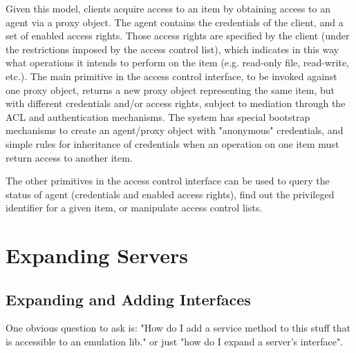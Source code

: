 Given this model, clients acquire access to an item by obtaining
access to an agent via a proxy object. The agent contains the
credentials of the client, and a set of enabled access rights. Those
access rights are specified by the client (under the restrictions
imposed by the access control list), which indicates in this way what
operations it intends to perform on the item (e.g. read-only file,
read-write, etc.). The main primitive in the access control interface,
to be invoked against one proxy object, returns a new proxy object
representing the same item, but with different credentials and/or
access rights, subject to mediation through the ACL and authentication
mechanisms. The system has special bootstrap mechanisms to create an
agent/proxy object with "anonymous" credentials, and simple rules for
inheritance of credentials when an operation on one item must return
access to another item.

The other primitives in the access control interface can be used to
query the status of agent (credentials and enabled access rights),
find out the privileged identifier for a given item, or manipulate
access control lists.

\section{Expanding Servers}

\subsection{Expanding and Adding Interfaces}
One obvious question to ask is:  "How do I add a service method to this
stuff that is accessible to an emulation lib." or just "how do I expand
a server's interface".

